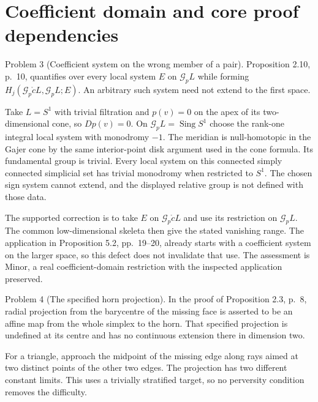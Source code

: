 \documentclass[10pt]{article}
\begin{document}
\section*{Coefficient domain and core proof dependencies}
Problem 3 (Coefficient system on the wrong member of a pair).  Proposition 2.10, p. 10, quantifies over every local system \(E\) on \(\mathcal G_pL\) while forming \(H_j(\mathcal G_p\mathring cL,\mathcal G_pL;E)\). An arbitrary such system need not extend to the first space.\par
Take \(L=S^1\) with trivial filtration and \(p(v)=0\) on the apex of its two-dimensional cone, so \(Dp(v)=0\). On \(\mathcal G_pL=\operatorname{Sing}S^1\) choose the rank-one integral local system with monodromy \(-1\). The meridian is null-homotopic in the Gajer cone by the same interior-point disk argument used in the cone formula. Its fundamental group is trivial. Every local system on this connected simply connected simplicial set has trivial monodromy when restricted to \(S^1\). The chosen sign system cannot extend, and the displayed relative group is not defined with those data.\par
The supported correction is to take \(E\) on \(\mathcal G_p\mathring cL\) and use its restriction on \(\mathcal G_pL\). The common low-dimensional skeleta then give the stated vanishing range. The application in Proposition 5.2, pp. 19–20, already starts with a coefficient system on the larger space, so this defect does not invalidate that use. The assessment is Minor, a real coefficient-domain restriction with the inspected application preserved.\par
Problem 4 (The specified horn projection).  In the proof of Proposition 2.3, p. 8, radial projection from the barycentre of the missing face is asserted to be an affine map from the whole simplex to the horn. That specified projection is undefined at its centre and has no continuous extension there in dimension two.\par
For a triangle, approach the midpoint of the missing edge along rays aimed at two distinct points of the other two edges. The projection has two different constant limits. This uses a trivially stratified target, so no perversity condition removes the difficulty.\par
\end{document}
